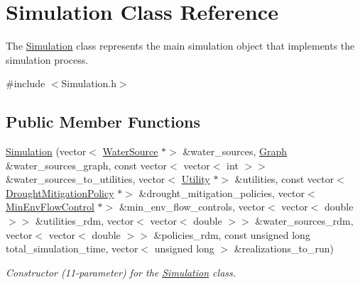 \hypertarget{classSimulation}{}\section{Simulation Class Reference}
\label{classSimulation}


The {\ttfamily \mbox{\hyperlink{classSimulation}{Simulation}}} class represents the main simulation object that implements the simulation process.  




{\ttfamily \#include $<$Simulation.\+h$>$}

\subsection*{Public Member Functions}
\begin{DoxyCompactItemize}
\item 
\mbox{\hyperlink{classSimulation_ac9b9db9c3de5f9ff33f6ea89e2435c87}{Simulation}} (vector$<$ \mbox{\hyperlink{classWaterSource}{Water\+Source}} $\ast$$>$ \&water\+\_\+sources, \mbox{\hyperlink{classGraph}{Graph}} \&water\+\_\+sources\+\_\+graph, const vector$<$ vector$<$ int $>$$>$ \&water\+\_\+sources\+\_\+to\+\_\+utilities, vector$<$ \mbox{\hyperlink{classUtility}{Utility}} $\ast$$>$ \&utilities, const vector$<$ \mbox{\hyperlink{classDroughtMitigationPolicy}{Drought\+Mitigation\+Policy}} $\ast$$>$ \&drought\+\_\+mitigation\+\_\+policies, vector$<$ \mbox{\hyperlink{classMinEnvFlowControl}{Min\+Env\+Flow\+Control}} $\ast$$>$ \&min\+\_\+env\+\_\+flow\+\_\+controls, vector$<$ vector$<$ double $>$$>$ \&utilities\+\_\+rdm, vector$<$ vector$<$ double $>$$>$ \&water\+\_\+sources\+\_\+rdm, vector$<$ vector$<$ double $>$$>$ \&policies\+\_\+rdm, const unsigned long total\+\_\+simulation\+\_\+time, vector$<$ unsigned long $>$ \&realizations\+\_\+to\+\_\+run)
\begin{DoxyCompactList}\small\item\em Constructor (11-\/parameter) for the \mbox{\hyperlink{classSimulation}{Simulation}} class. \end{DoxyCompactList}\item 

\end{DoxyCompactItemize}
